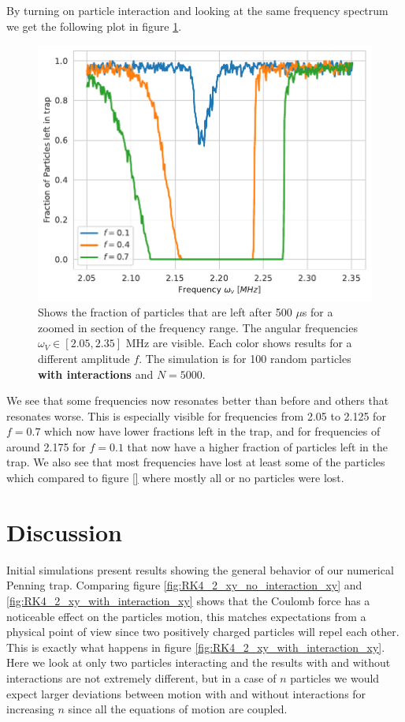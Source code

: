\documentclass[english,notitlepage,reprint,nofootinbib]{revtex4-1}  %
\begin{document}
By turning on particle interaction and looking at the same frequency spectrum we get the following plot in figure \ref{fig:narrow_freq_p_left_N_5000_interaction_zoom}.
\begin{figure}[H]
    \centering
    \includegraphics[width=.5\textwidth]{../figures/narrow_freq_p_left_N_5000_interaction_zoom.pdf}
    \caption{Shows the fraction of particles that are left after 500 $\mu$s for a zoomed in section of the frequency range. The angular frequencies $\omega_V \in [2.05,2.35]$ MHz are visible. Each color shows results for a
        different amplitude $f$. The simulation is for 100 random particles \textbf{with interactions} and $N = 5000$.}
    \label{fig:narrow_freq_p_left_N_5000_interaction_zoom}
\end{figure}
We see that some frequencies now resonates better than before and others that resonates worse. This is especially visible for frequencies from 2.05 to 2.125 for $f=0.7$ which now have lower fractions left in the trap, and for frequencies of around 2.175 for $f=0.1$ that now have a higher fraction of particles left in the trap. We also see that most frequencies have lost at least some of the particles which compared to figure \ref{} where mostly all or no particles were lost.

\section{Discussion}\label{sec:discussion}

Initial simulations present results showing the general behavior of our numerical Penning trap.
Comparing figure \ref{fig:RK4_2_xy_no_interaction_xy} and \ref{fig:RK4_2_xy_with_interaction_xy} shows that the Coulomb force has a noticeable effect on
the particles motion, this matches expectations from a physical point of view since two positively charged particles will repel each other. This is exactly what happens in figure \ref{fig:RK4_2_xy_with_interaction_xy}. Here we look at only two particles interacting and the results with and without interactions are not extremely different,
but in a case of $n$ particles we would expect larger deviations between motion with and without interactions for increasing $n$ since all the equations of motion are coupled.
\end{document}
